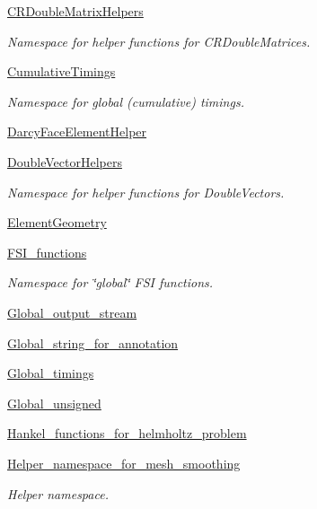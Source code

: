 \begin{DoxyCompactItemize}
 \hyperlink{namespaceoomph_1_1CRDoubleMatrixHelpers}{C\+R\+Double\+Matrix\+Helpers}
\begin{DoxyCompactList}\small\item\em Namespace for helper functions for C\+R\+Double\+Matrices. \end{DoxyCompactList}\item 
 \hyperlink{namespaceoomph_1_1CumulativeTimings}{Cumulative\+Timings}
\begin{DoxyCompactList}\small\item\em Namespace for global (cumulative) timings. \end{DoxyCompactList}\item 
 \hyperlink{namespaceoomph_1_1DarcyFaceElementHelper}{Darcy\+Face\+Element\+Helper}
\item 
 \hyperlink{namespaceoomph_1_1DoubleVectorHelpers}{Double\+Vector\+Helpers}
\begin{DoxyCompactList}\small\item\em Namespace for helper functions for Double\+Vectors. \end{DoxyCompactList}\item 
 \hyperlink{namespaceoomph_1_1ElementGeometry}{Element\+Geometry}
\item 
 \hyperlink{namespaceoomph_1_1FSI__functions}{F\+S\+I\+\_\+functions}
\begin{DoxyCompactList}\small\item\em Namespace for \char`\"{}global\char`\"{} F\+SI functions. \end{DoxyCompactList}\item 
 \hyperlink{namespaceoomph_1_1Global__output__stream}{Global\+\_\+output\+\_\+stream}
\item 
 \hyperlink{namespaceoomph_1_1Global__string__for__annotation}{Global\+\_\+string\+\_\+for\+\_\+annotation}
\item 
 \hyperlink{namespaceoomph_1_1Global__timings}{Global\+\_\+timings}
\item 
 \hyperlink{namespaceoomph_1_1Global__unsigned}{Global\+\_\+unsigned}
\item 
 \hyperlink{namespaceoomph_1_1Hankel__functions__for__helmholtz__problem}{Hankel\+\_\+functions\+\_\+for\+\_\+helmholtz\+\_\+problem}
\item 
 \hyperlink{namespaceoomph_1_1Helper__namespace__for__mesh__smoothing}{Helper\+\_\+namespace\+\_\+for\+\_\+mesh\+\_\+smoothing}
\begin{DoxyCompactList}\small\item\em Helper namespace. \end{DoxyCompactList}\item 

\end{DoxyCompactItemize}
